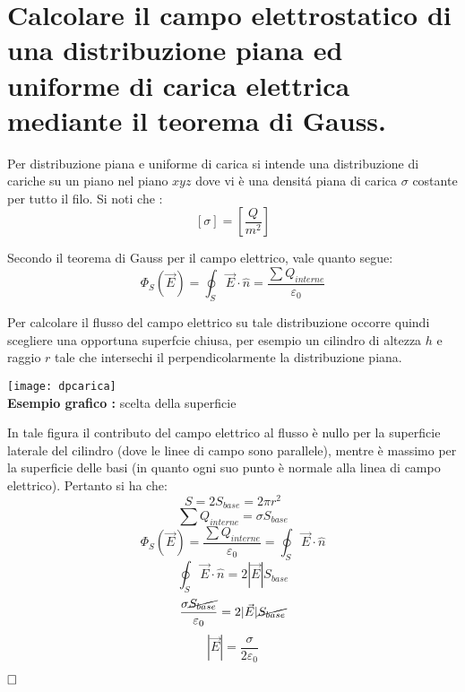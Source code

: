     \section{Calcolare il campo elettrostatico di una distribuzione
    	piana ed uniforme di carica elettrica mediante il teorema di
    	Gauss.}
    Per distribuzione piana e uniforme di carica si intende una distribuzione di cariche su un piano nel piano $xyz$ dove vi \`e una densit\'a piana di carica $\sigma$ costante per tutto il filo.
    Si noti che :
    $$ \left[\sigma\right] =  \left[\frac{Q}{m^2}\right] $$
    
    Secondo il teorema di Gauss per il campo elettrico, vale quanto segue:
    \begin{displaymath}
    \Phi_S\left(\vec{E}\right) = \oint_{S}{\vec{E} \cdot \hat{n}} = \frac{\sum{Q_{interne}}}{\varepsilon_0}
    \end{displaymath}
    
    Per calcolare il flusso del campo elettrico su tale distribuzione occorre quindi scegliere una opportuna superfcie chiusa, per esempio un cilindro di altezza $h$ e raggio $r$ tale che intersechi il perpendicolarmente la distribuzione piana.
    
    \begin{center}
    	\texttt{[image: dpcarica]}\\
    	\textbf{Esempio grafico :} scelta della superficie
    \end{center}
    
    \pagebreak
    In tale figura il contributo del campo elettrico al flusso \`e nullo per la superficie laterale del cilindro (dove le linee di campo sono parallele), mentre \`e massimo per la superficie delle basi (in quanto ogni suo punto \`e normale alla linea di campo elettrico). Pertanto si ha che:
    $$ S = 2 S_{base} = 2 \pi r^2 $$
    $$ \sum{Q_{interne}} = \sigma S_{base} $$
    $$ \Phi_S\left(\vec{E}\right) = \frac{\sum{Q_{interne}}}{\varepsilon_0} = \oint_{S}{\vec{E} \cdot \hat{n}} $$
    $$ \oint_{S}{\vec{E} \cdot \hat{n}} = 2|\vec{E}| S_{base} $$
    $$ \frac{\sigma \cancel{S_{base}}}{\varepsilon_0} = 2|\vec{E}| \cancel{S_{base}} $$
	$$ |\vec{E}| = \frac{\sigma}{2 \varepsilon_0} $$
	
	$\hfill\square$